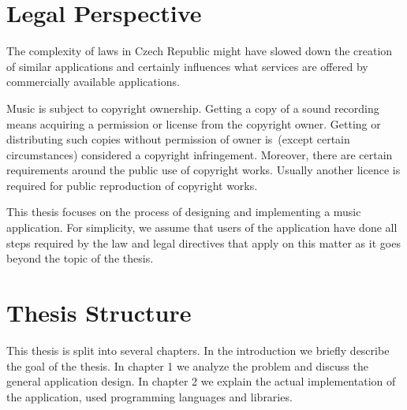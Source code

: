 \section*{Legal Perspective}

The complexity of laws in Czech Republic might have slowed down the creation of similar applications and certainly influences what services are offered by commercially available applications.
\par
Music is subject to copyright ownership. Getting a copy of a sound recording means acquiring a permission or license from the copyright owner. Getting or distributing such copies without permission of owner is~(except certain circumstances) considered a copyright infringement. Moreover, there are certain requirements around the public use of copyright works. Usually another licence is required for public reproduction of copyright works.
\par
This thesis focuses on the process of designing and implementing a music application. For simplicity, we assume that users of the application have done all steps required by the law and legal directives that apply on this matter as it goes beyond the topic of the thesis.

\section*{Thesis Structure}

This thesis is split into several chapters. In the introduction we briefly describe the goal of the thesis. In chapter 1 we analyze the problem and discuss the general application design. In chapter 2 we explain the actual implementation of the application, used programming languages and libraries.




